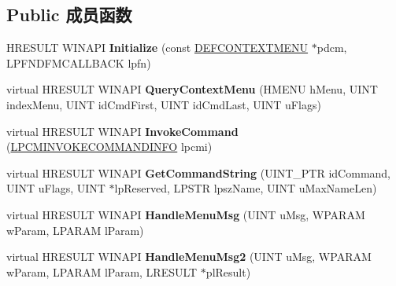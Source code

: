 \subsection*{Public 成员函数}
\begin{DoxyCompactItemize}
\item 
\mbox{\label{class_c_default_context_menu_a807106fbc0f359e378b3f9e4ce1a0a1e}} 
H\+R\+E\+S\+U\+LT W\+I\+N\+A\+PI {\bfseries Initialize} (const \hyperlink{struct_d_e_f_c_o_n_t_e_x_t_m_e_n_u}{D\+E\+F\+C\+O\+N\+T\+E\+X\+T\+M\+E\+NU} $\ast$pdcm, L\+P\+F\+N\+D\+F\+M\+C\+A\+L\+L\+B\+A\+CK lpfn)
\item 
\mbox{\label{class_c_default_context_menu_a0a271edc07e08892c26317345e9ddd06}} 
virtual H\+R\+E\+S\+U\+LT W\+I\+N\+A\+PI {\bfseries Query\+Context\+Menu} (H\+M\+E\+NU h\+Menu, U\+I\+NT index\+Menu, U\+I\+NT id\+Cmd\+First, U\+I\+NT id\+Cmd\+Last, U\+I\+NT u\+Flags)
\item 
\mbox{\label{class_c_default_context_menu_a1931741736b60b23fe9e79733bc9d3a6}} 
virtual H\+R\+E\+S\+U\+LT W\+I\+N\+A\+PI {\bfseries Invoke\+Command} (\hyperlink{struct_i_context_menu_1_1tag_c_m_i_n_v_o_k_e_c_o_m_m_a_n_d_i_n_f_o}{L\+P\+C\+M\+I\+N\+V\+O\+K\+E\+C\+O\+M\+M\+A\+N\+D\+I\+N\+FO} lpcmi)
\item 
\mbox{\label{class_c_default_context_menu_a74fabaedd49c184feaf2ae699e42aa56}} 
virtual H\+R\+E\+S\+U\+LT W\+I\+N\+A\+PI {\bfseries Get\+Command\+String} (U\+I\+N\+T\+\_\+\+P\+TR id\+Command, U\+I\+NT u\+Flags, U\+I\+NT $\ast$lp\+Reserved, L\+P\+S\+TR lpsz\+Name, U\+I\+NT u\+Max\+Name\+Len)
\item 
\mbox{\label{class_c_default_context_menu_a0f1a3dafd8bd3b8d621fb971248086e6}} 
virtual H\+R\+E\+S\+U\+LT W\+I\+N\+A\+PI {\bfseries Handle\+Menu\+Msg} (U\+I\+NT u\+Msg, W\+P\+A\+R\+AM w\+Param, L\+P\+A\+R\+AM l\+Param)
\item 
\mbox{\label{class_c_default_context_menu_af1e162e5ed5aa586b5307c0cc719b2f9}} 
virtual H\+R\+E\+S\+U\+LT W\+I\+N\+A\+PI {\bfseries Handle\+Menu\+Msg2} (U\+I\+NT u\+Msg, W\+P\+A\+R\+AM w\+Param, L\+P\+A\+R\+AM l\+Param, L\+R\+E\+S\+U\+LT $\ast$pl\+Result)

\end{DoxyCompactItemize}
